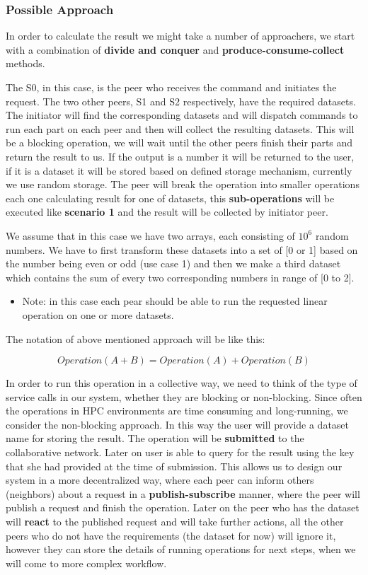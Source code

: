 \iffalse

\subsubsection{Possible Approach}
In order to calculate the result we might take a number of approachers, we start with a combination of \textbf{divide and conquer} and
\textbf{produce-consume-collect} methods.

The S0, in this case, is the peer who receives the command and initiates the request. The two other peers, S1 and S2 respectively, have the required
datasets. The initiator will find the corresponding datasets and will dispatch commands to run each part on each peer and then will collect
the resulting datasets. This will be a blocking operation, we will wait until the other peers finish their parts and return the result
to us. If the output is a number it will be returned to the user, if it is a dataset it will be stored based on defined storage mechanism, 
currently we use random storage. The peer will break the operation into smaller operations each one calculating result for one of datasets, 
this \textbf{sub-operations} will be executed like \textbf{scenario 1} and the result will be collected by initiator peer.

We assume that in this case we have two arrays, each consisting of \(10^6\) random numbers. We have to first transform these datasets into
a set of [0 or 1] based on the number being even or odd (use case 1) and then we make a third dataset which contains the sum of every two
corresponding numbers in range of [0 to 2].


\begin{itemize}
\item Note: in this case each pear should be able to run the requested linear operation on one or more datasets.
\end{itemize}

The notation of above mentioned approach will be like this:

\[ Operation(A + B) = Operation(A) + Operation(B) \]

In order to run this operation in a collective way, we need to think of the type of service calls in our system, whether they are blocking or
non-blocking. Since often the operations in HPC environments are time consuming and long-running, we consider the non-blocking approach. In
this way the user will provide a dataset name for storing the result. The operation will be \textbf{submitted} to the collaborative network.
Later on user is able to query for the result using the key that she had provided at the time of submission. This allows us to design our system
in a more decentralized way, where each peer can inform others (neighbors) about a request in a \textbf{publish-subscribe} manner, where the peer
will publish a request and finish the operation. Later on the peer who has the dataset will \textbf{react} to the published request and will take
further actions, all the other peers who do not have the requirements (the dataset for now) will ignore it, however they can store the details of 
running operations for next steps, when we will come to more complex workflow.

